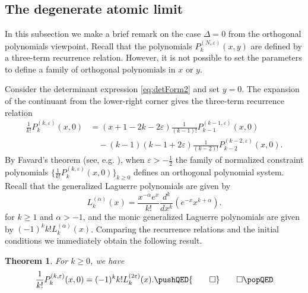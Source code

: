 \documentclass[11pt]{article}
\numberwithin{equation}{section}
\newcommand{\e}{\varepsilon}
\newcommand{\cp}[2]{P^{(#1)}_{#2}} %
\newcommand{\QEDhere}{\pushQED{\qed}\qedhere\popQED}
\theoremstyle{plain}
\newtheorem{thm}{Theorem}[section]
\theoremstyle{definition}
\theoremstyle{remark}
\begin{document}
\subsection{The degenerate atomic limit} \label{sec:orthopoly}

In this subsection we make a brief remark on the case \(\Delta = 0 \) from the orthogonal polynomials viewpoint. Recall that the polynomials
\(\cp{N,\e}{k}(x,y)\) are defined by a three-term recurrence relation. However, it is not possible to set the parameters to define a family of orthogonal polynomials in \(x\) or \(y\).

Consider the determinant expression \eqref{eq:detForm2} and set \(y=0\). The expansion of the continuant from the lower-right corner gives
the three-term recurrence relation
\begin{align*}
  \frac{1}{k!}\cp{k,\e}{k}(x,0)
  &= (x +1 - 2 k - 2\e ) \frac{1}{(k-1)!}\cp{k-1,\e}{k-1}(x,0) \\
  &\quad{}- (k-1) (k-1 + 2\e) \frac{1}{(k-2)!} \cp{k-2,\e}{k-2}(x,0).
\end{align*}
By Favard's theorem (see, e.g.  \cite{C1978}), when \(\e > -\frac12 \) the family of normalized constraint polynomials
\(\{\frac{1}{k!}\cp{k,\e}{k}(x,0) \}_{k \geq 0} \) defines an orthogonal polynomial system. Recall that the generalized Laguerre polynomials
\cite{AAR1999} are given by
\[
  L^{(\alpha)}_k (x) = \frac{x^{-\alpha}e^x}{k!} \frac{d^k}{d x^k} (e^{-x}x^{k+\alpha}).
\]
for \(k \geq 1\) and \(\alpha > -1 \), and the monic generalized Laguerre polynomials are given by \((-1)^k k! L^{(\alpha)}_k (x)\). Comparing the recurrence
relations and the initial conditions we immediately obtain the following result.

\begin{thm}\label{thm:Laguerre}
  For \(k \geq 0 \), we have
  \[
    \frac{1}{k!}\cp{k,\e}{k}(x,0) = (-1)^k k! L^{(2\e)}_k (x). \QEDhere%
  \]
\end{thm}
\end{document}
